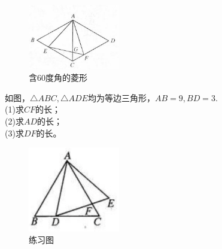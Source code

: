 \documentclass{ecnuthesis}
\begin{document}
\begin{figure}[H]
\centering
\includegraphics[width=4cm]{picture/608.png}
\caption{含60度角的菱形}
\end{figure}
\begin{problem}
    如图，$\triangle ABC,\triangle ADE$均为等边三角形，$AB=9,BD=3$. \\
    (1)求$CF$的长；\\
    (2)求$AD$的长；\\
    (3)求$DF$的长。\\
\end{problem}
\begin{figure}[H]
\centering
\includegraphics[width=4cm]{picture/839.png}
\caption{练习图}
\end{figure}
\clearpage
\end{document}
